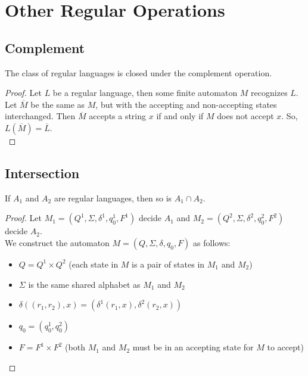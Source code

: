 \documentclass[11pt,a4paper]{article}
\begin{document}
\section{Other Regular Operations}
\subsection{Complement}
\begin{theorem}
    The class of regular languages is closed under the complement operation.

    \begin{proof}
        Let $L$ be a regular language, then some finite automaton $M$ recognizes $L$. \\

        Let $\overline{M}$ be the same as $M$, but with the accepting and non-accepting states interchanged.
        Then $\overline{M}$ accepts a string $x$ if and only if $M$ does not accept $x$. So, $L(\overline{M})=\overline{L}$. \\
    \end{proof}
\end{theorem}

\subsection{Intersection}
\begin{theorem}
    If $A_1$ and $A_2$ are regular languages, then so is $A_1\cap A_2$.

    \begin{proof}
        Let $M_1=(Q^1,\Sigma,\delta^1,q_0^1,F^1)$ decide $A_1$ and $M_2=(Q^2,\Sigma,\delta^2,q_0^2,F^2)$ decide $A_2$. \\

        We construct the automaton $M=(Q,\Sigma,\delta,q_0,F)$ as follows:
        \begin{itemize}
            \item $Q=Q^1\times Q^2$ (each state in $M$ is a pair of states in $M_1$ and $M_2$)
            \item $\Sigma$ is the same shared alphabet as $M_1$ and $M_2$
            \item $\delta((r_1,r_2),x)=(\delta^1(r_1,x),\delta^2(r_2,x))$
            \item $q_0=(q_0^1,q_0^2)$
            \item $F=F^1\times F^2$ (both $M_1$ and $M_2$ must be in an accepting state for $M$ to accept)
        \end{itemize}
    \end{proof}
\end{theorem}
\end{document}
